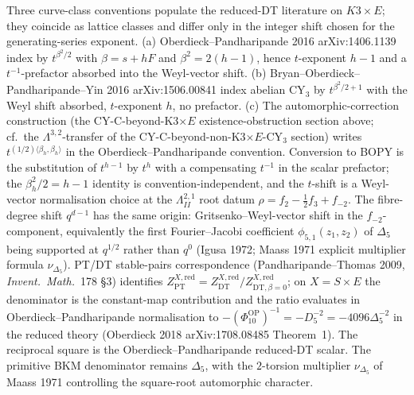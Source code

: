 \begin{remark}
\label{rem:cy-c-beyond-k3e-beta-h-conventions}
Three curve-class conventions populate the reduced-DT literature on
$K3\times E$; they coincide as lattice classes and differ only in the
integer shift chosen for the generating-series exponent.
\textup{(a)} Oberdieck--Pandharipande 2016 arXiv:1406.1139 index by
$t^{\beta^2/2}$ with $\beta = s+hF$ and $\beta^2 = 2(h-1)$, hence
$t$-exponent $h-1$ and a $t^{-1}$-prefactor absorbed into the
Weyl-vector shift.
\textup{(b)} Bryan--Oberdieck--Pandharipande--Yin 2016
arXiv:1506.00841 index abelian CY$_3$ by $t^{\beta^2/2+1}$ with the
Weyl shift absorbed, $t$-exponent $h$, no prefactor.
\textup{(c)} The automorphic-correction construction
(the CY-C-beyond-K3$\times E$ existence-obstruction section above; cf.\ the
$\Lambda^{3,2}$-transfer of the CY-C-beyond-non-K3$\times E$-CY$_3$ section)
writes $t^{(1/2)\langle\beta_h,\beta_h\rangle}$ in the Oberdieck--Pandharipande convention.
Conversion to BOPY is the substitution of $t^{h-1}$ by $t^h$ with a
compensating $t^{-1}$ in the scalar prefactor; the $\beta_h^2/2 = h-1$
identity is convention-independent, and the $t$-shift is a
Weyl-vector normalisation choice at the $\Lambda^{2,1}_{II}$
root datum $\rho = f_2-\tfrac12 f_3+f_{-2}$. The fibre-degree shift
$q^{d-1}$ has the same origin: Gritsenko--Weyl-vector shift in the
$f_{-2}$-component, equivalently the first Fourier--Jacobi coefficient
$\phi_{5,1}(z_1,z_2)$ of $\Delta_5$ being supported at $q^{1/2}$
rather than $q^0$ (Igusa 1972; Maass 1971 explicit multiplier formula
$\nu_{\Delta_5}$). PT/DT stable-pairs correspondence
(Pandharipande--Thomas 2009, \emph{Invent.\ Math.}~178 \S 3) identifies
$Z_{\mathrm{PT}}^{X,\mathrm{red}}
= Z^{X,\mathrm{red}}_{\mathrm{DT}}/Z^{X,\mathrm{red}}_{\mathrm{DT},\beta=0}$;
on $X=S\times E$ the denominator is the constant-map contribution and
the ratio evaluates in Oberdieck--Pandharipande normalisation to
$-(\Phi_{10}^{\mathrm{OP}})^{-1}=-D_5^{-2}
=-4096\Delta_5^{-2}$ in the reduced theory (Oberdieck 2018
arXiv:1708.08485 Theorem~1). The reciprocal square is the
Oberdieck--Pandharipande reduced-DT
scalar. The primitive BKM denominator remains $\Delta_5$, with the
$2$-torsion multiplier $\nu_{\Delta_5}$ of Maass 1971 controlling the
square-root automorphic character.
\end{remark}

